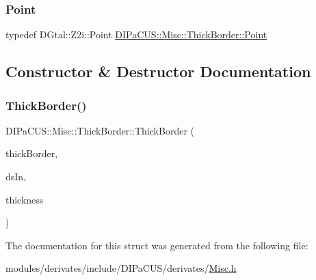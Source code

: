 \subsubsection{\texorpdfstring{Point}{Point}}
{\footnotesize\ttfamily typedef D\+Gtal\+::\+Z2i\+::\+Point \mbox{\hyperlink{structDIPaCUS_1_1Misc_1_1ThickBorder_ae295c13d112a91997154ec08edcbd01d}{D\+I\+Pa\+C\+U\+S\+::\+Misc\+::\+Thick\+Border\+::\+Point}}}



\subsection{Constructor \& Destructor Documentation}
\mbox{\label{structDIPaCUS_1_1Misc_1_1ThickBorder_aab612b502416009a6ae33d36830de1d6}} 
\subsubsection{\texorpdfstring{Thick\+Border()}{ThickBorder()}}
{\footnotesize\ttfamily D\+I\+Pa\+C\+U\+S\+::\+Misc\+::\+Thick\+Border\+::\+Thick\+Border (\begin{DoxyParamCaption}\item[{\mbox{\hyperlink{structDIPaCUS_1_1Misc_1_1ThickBorder_a0fc2e5498fb6c524bebb4965338a9189}{Digital\+Set}} \&}]{thick\+Border,  }\item[{const \mbox{\hyperlink{structDIPaCUS_1_1Misc_1_1ThickBorder_a0fc2e5498fb6c524bebb4965338a9189}{Digital\+Set}} \&}]{ds\+In,  }\item[{int}]{thickness }\end{DoxyParamCaption})}



The documentation for this struct was generated from the following file\+:\begin{DoxyCompactItemize}
\item 
modules/derivates/include/\+D\+I\+Pa\+C\+U\+S/derivates/\mbox{\hyperlink{Misc_8h}{Misc.\+h}}\end{DoxyCompactItemize}

